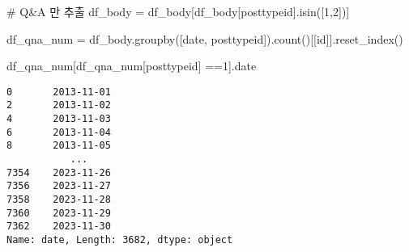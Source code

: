 \documentclass[
  letterpaper,
  DIV=11,
  numbers=noendperiod]{scrartcl}
\newenvironment{Shaded}{\begin{snugshade}}{\end{snugshade}}
\newcommand{\CommentTok}[1]{\textcolor[rgb]{0.37,0.37,0.37}{#1}}
\newcommand{\NormalTok}[1]{\textcolor[rgb]{0.00,0.23,0.31}{#1}}
\newcommand{\OperatorTok}[1]{\textcolor[rgb]{0.37,0.37,0.37}{#1}}
\newcommand{\StringTok}[1]{\textcolor[rgb]{0.13,0.47,0.30}{#1}}
\begin{document}
\begin{Shaded}
\begin{Highlighting}[]
\CommentTok{\# Q\&A 만 추출 }
\NormalTok{df\_body }\OperatorTok{=}\NormalTok{ df\_body[df\_body[}\StringTok{\textquotesingle{}posttypeid\textquotesingle{}}\NormalTok{].isin([}\StringTok{\textquotesingle{}1\textquotesingle{}}\NormalTok{,}\StringTok{\textquotesingle{}2\textquotesingle{}}\NormalTok{])]}
\end{Highlighting}
\end{Shaded}

\begin{Shaded}
\begin{Highlighting}[]
\NormalTok{df\_qna\_num }\OperatorTok{=}\NormalTok{ df\_body.groupby([}\StringTok{\textquotesingle{}date\textquotesingle{}}\NormalTok{, }\StringTok{\textquotesingle{}posttypeid\textquotesingle{}}\NormalTok{]).count()[[}\StringTok{\textquotesingle{}id\textquotesingle{}}\NormalTok{]].reset\_index()}
\end{Highlighting}
\end{Shaded}

\begin{Shaded}
\begin{Highlighting}[]
\NormalTok{df\_qna\_num[df\_qna\_num[}\StringTok{\textquotesingle{}posttypeid\textquotesingle{}}\NormalTok{] }\OperatorTok{==}\StringTok{\textquotesingle{}1\textquotesingle{}}\NormalTok{].date}
\end{Highlighting}
\end{Shaded}

\begin{verbatim}
0       2013-11-01
2       2013-11-02
4       2013-11-03
6       2013-11-04
8       2013-11-05
           ...    
7354    2023-11-26
7356    2023-11-27
7358    2023-11-28
7360    2023-11-29
7362    2023-11-30
Name: date, Length: 3682, dtype: object
\end{verbatim}
\end{document}
